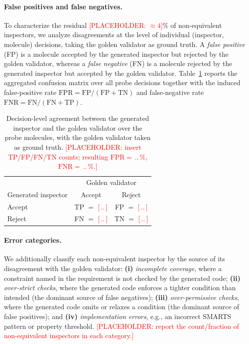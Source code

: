 \documentclass[10pt]{article} %
\begin{document}
    \paragraph{False positives and false negatives.}
    To characterize the residual \textcolor{red}{[PLACEHOLDER: $\approx 4$]}\% of non-equivalent inspectors, we analyze disagreements at the level of individual (inspector, molecule) decisions, taking the golden validator as ground truth. A \emph{false positive} (FP) is a molecule accepted by the generated inspector but rejected by the golden validator, whereas a \emph{false negative} (FN) is a molecule rejected by the generated inspector but accepted by the golden validator. Table~\ref{tab:inspector_confusion} reports the aggregated confusion matrix over all probe decisions together with the induced false-positive rate $\mathrm{FPR}=\mathrm{FP}/(\mathrm{FP}+\mathrm{TN})$ and false-negative rate $\mathrm{FNR}=\mathrm{FN}/(\mathrm{FN}+\mathrm{TP})$.

    \begin{table}[h]
        \centering
        \small
        \begin{tabular}{l|cc}
            \toprule
             & \multicolumn{2}{c}{Golden validator} \\
            Generated inspector & Accept & Reject \\
            \midrule
            Accept & TP $=$ \textcolor{red}{[\,..\,]} & FP $=$ \textcolor{red}{[\,..\,]} \\
            Reject & FN $=$ \textcolor{red}{[\,..\,]} & TN $=$ \textcolor{red}{[\,..\,]} \\
            \bottomrule
        \end{tabular}
        \caption{Decision-level agreement between the generated inspector and the golden validator over the probe molecules, with the golden validator taken as ground truth. \textcolor{red}{[PLACEHOLDER: insert TP/FP/FN/TN counts; resulting $\mathrm{FPR}=$\,..\,\%, $\mathrm{FNR}=$\,..\,\%.]}}
        \label{tab:inspector_confusion}
    \end{table}

    \paragraph{Error categories.}
    We additionally classify each non-equivalent inspector by the source of its disagreement with the golden validator: \textbf{(i)} \emph{incomplete coverage}, where a constraint named in the requirement is not checked by the generated code; \textbf{(ii)} \emph{over-strict checks}, where the generated code enforces a tighter condition than intended (the dominant source of false negatives); \textbf{(iii)} \emph{over-permissive checks}, where the generated code omits or relaxes a condition (the dominant source of false positives); and \textbf{(iv)} \emph{implementation errors}, e.g., an incorrect SMARTS pattern or property threshold. \textcolor{red}{[PLACEHOLDER: report the count/fraction of non-equivalent inspectors in each category.]}
\end{document}
